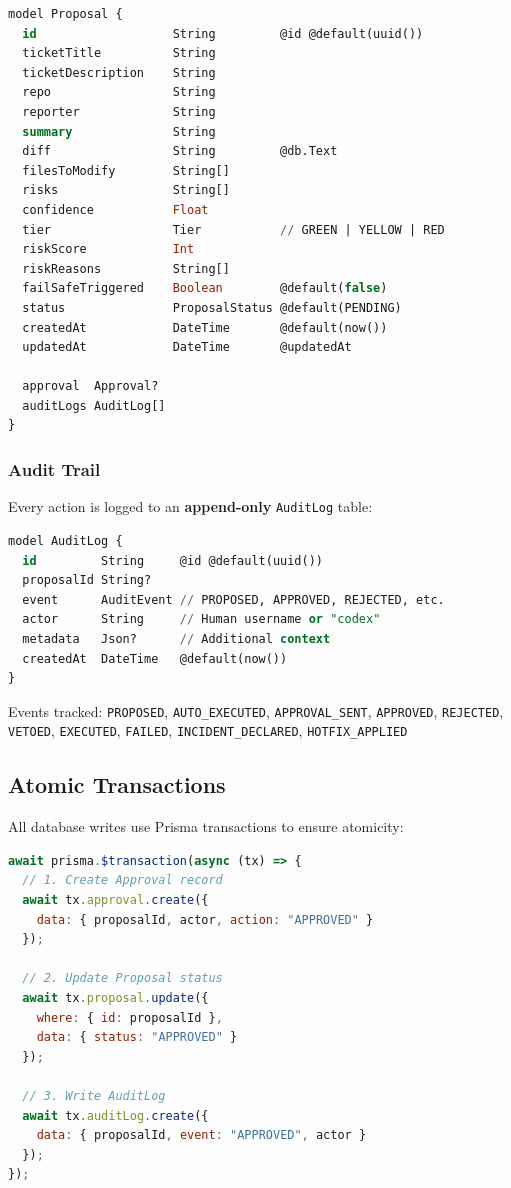 \documentclass[11pt,a4paper]{article}
\begin{document}
\begin{lstlisting}[language=SQL,caption=Proposal Model (schema.prisma)]
model Proposal {
  id                   String         @id @default(uuid())
  ticketTitle          String
  ticketDescription    String
  repo                 String
  reporter             String
  summary              String
  diff                 String         @db.Text
  filesToModify        String[]
  risks                String[]
  confidence           Float
  tier                 Tier           // GREEN | YELLOW | RED
  riskScore            Int
  riskReasons          String[]
  failSafeTriggered    Boolean        @default(false)
  status               ProposalStatus @default(PENDING)
  createdAt            DateTime       @default(now())
  updatedAt            DateTime       @updatedAt
  
  approval  Approval?
  auditLogs AuditLog[]
}
\end{lstlisting}

\subsubsection{Audit Trail}
Every action is logged to an \textbf{append-only} \texttt{AuditLog} table:

\begin{lstlisting}[language=SQL,caption=AuditLog Model]
model AuditLog {
  id         String     @id @default(uuid())
  proposalId String?
  event      AuditEvent // PROPOSED, APPROVED, REJECTED, etc.
  actor      String     // Human username or "codex"
  metadata   Json?      // Additional context
  createdAt  DateTime   @default(now())
}
\end{lstlisting}

Events tracked: \texttt{PROPOSED}, \texttt{AUTO\_EXECUTED}, \texttt{APPROVAL\_SENT}, \texttt{APPROVED}, \texttt{REJECTED}, \texttt{VETOED}, \texttt{EXECUTED}, \texttt{FAILED}, \texttt{INCIDENT\_DECLARED}, \texttt{HOTFIX\_APPLIED}

\newpage
\subsection{Atomic Transactions}

All database writes use Prisma transactions to ensure atomicity:

\begin{lstlisting}[language=JavaScript,caption=Approval Transaction (approval.ts)]
await prisma.$transaction(async (tx) => {
  // 1. Create Approval record
  await tx.approval.create({
    data: { proposalId, actor, action: "APPROVED" }
  });
  
  // 2. Update Proposal status
  await tx.proposal.update({
    where: { id: proposalId },
    data: { status: "APPROVED" }
  });
  
  // 3. Write AuditLog
  await tx.auditLog.create({
    data: { proposalId, event: "APPROVED", actor }
  });
});
\end{lstlisting}
\end{document}
